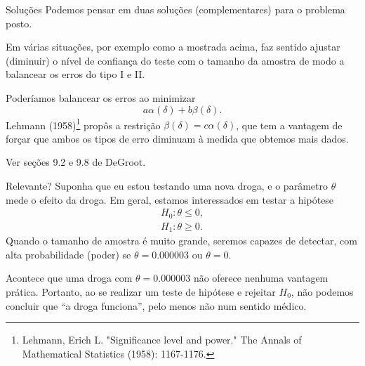 \begin{frame}{Soluções}
 Podemos pensar em duas soluções (complementares) para o problema posto.
\begin{ideia}
 Em várias situações, por exemplo como a mostrada acima, faz sentido ajustar (diminuir) o nível de confiança do teste com o tamanho da amostra de modo a balancear os erros do tipo I e II.
\end{ideia}

\begin{ideia}
Poderíamos balancear os erros ao minimizar
\[ a \alpha(\delta) + b \beta(\delta). \]
Lehmann (1958)\footnote{Lehmann, Erich L. "Significance level and power." The Annals of Mathematical Statistics (1958): 1167-1176.} propôs a restrição $\beta(\delta) = c \alpha(\delta)$, que tem a vantagem de forçar que ambos os tipos de erro diminuam à medida que obtemos mais dados.
\end{ideia}
Ver seções 9.2 e 9.8 de DeGroot.
\end{frame}

\begin{frame}{Relevante?}
 Suponha que eu estou testando uma nova droga, e o parâmetro $\theta$ mede o efeito da droga.
 Em geral, estamos interessados em testar a hipótese
 \begin{align*}
 H_0: \theta \leq 0,\\
 H_1: \theta \geq  0.
 \end{align*}
Quando o tamanho de amostra é muito grande, seremos capazes de detectar, com alta probabilidade (poder) se $\theta = 0.000003$ ou $\theta = 0$.

Acontece que uma droga com $\theta = 0.000003$ não oferece nenhuma vantagem prática.
Portanto, ao se realizar um teste de hipótese e rejeitar $H_0$, não podemos concluir que ``a droga funciona'', pelo menos não num sentido médico.
\begin{ideia}
 \end{ideia}
\end{frame}

